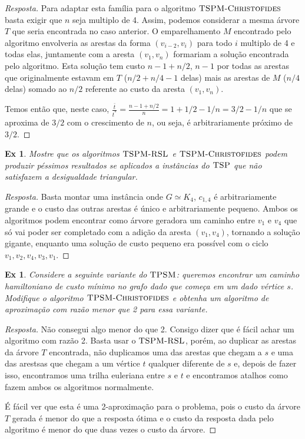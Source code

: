 \documentclass[12pt]{article}
\newcounter{exCounter}
\newtheorem{ex}[exCounter]{Ex}
\begin{document}
\begin{proof}[Resposta]
Para adaptar esta família para o algoritmo $\textsc{TSPM-Christofides}$ basta exigir que $n$ seja multiplo de 4. Assim, podemos considerar a mesma árvore $T$ que seria encontrada no caso anterior. O emparelhamento $M$ encontrado pelo algoritmo envolveria as arestas da forma $(v_{i-2}, v_{i})$ para todo $i$ multiplo de 4 e todas elas, juntamente com a aresta $(v_1,v_n)$ formariam a solução encontrada pelo algoritmo. Esta solução tem custo $n-1+n/2$, $n-1$ por todas as arestas que originalmente estavam em $T$ ($n/2+n/4-1$ delas) mais as arestas de $M$ ($n/4$ delas) somado ao $n/2$ referente ao custo da aresta $(v_1,v_n)$.  

Temos então que, neste caso, $\frac{\bar{t}}{t^*} = \frac{n-1+n/2}{n} = 1 + 1/2 - 1/n = 3/2 - 1/n$ que se aproxima de $3/2$ com o crescimento de $n$, ou seja, é arbitrariamente próximo de $3/2$.
\end{proof}

\begin{ex}
Mostre que os algoritmos $\textsc{TSPM-RSL}$ e $\textsc{TSPM-Christofides}$ podem produzir péssimos resultados se aplicados a instâncias do $\textsc{TSP}$ que não satisfazem a desigualdade triangular.
\end{ex}

\begin{proof}[Resposta]
Basta montar uma instância onde $G \simeq K_4$, $c_{1,4}$ é arbitrariamente grande e o custo das outras arestas é único e arbitrariamente pequeno. Ambos os algoritmos podem encontrar como árvore geradora um caminho entre $v_1$ e $v_4$ que só vai poder ser completado com a adição da aresta $(v_1,v_4)$, tornando a solução gigante, enquanto uma solução de custo pequeno era possível com o ciclo $v_1, v_2, v_4, v_3, v_1$.
\end{proof}

\begin{ex}
Considere a seguinte variante do $\textsc{TPSM}$: queremos encontrar um caminho hamiltoniano de custo mínimo no grafo dado que começa em um dado vértice $s$. Modifique o algoritmo $\textsc{TPSM-Christofides}$ e obtenha um algoritmo de aproximação com razão menor que 2 para essa variante.
\end{ex}

\begin{proof}[Resposta]
Não consegui algo menor do que 2. Consigo dizer que é fácil achar um algoritmo com razão 2. Basta usar o $\textsc{TSPM-RSL}$, porém, ao duplicar as arestas da árvore $T$ encontrada, não duplicamos uma das arestas que chegam a $s$ e uma das arestsas que chegam a um vértice $t$ qualquer diferente de $s$ e, depois de fazer isso, encontramos uma trilha euleriana entre $s$ e $t$ e encontramos atalhos como fazem ambos os algoritmos normalmente.  

É fácil ver que esta é uma 2-aproximação para o problema, pois o custo da árvore $T$ gerada é menor do que a resposta ótima e o custo da resposta dada pelo algoritmo é menor do que duas vezes o custo da árvore.
\end{proof}
\end{document}
